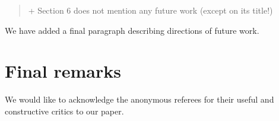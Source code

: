 \documentclass[12pt,a4wide]{article}
\begin{document}
\begin{quotation}\sf\footnotesize

+ Section 6 does not mention any future work (except on its title!) 

\end{quotation}

\noindent 
We have added a final paragraph describing directions of future work.



\section*{Final remarks}

We would like to acknowledge the anonymous referees for their useful and constructive critics to our paper.


  
\end{document}
